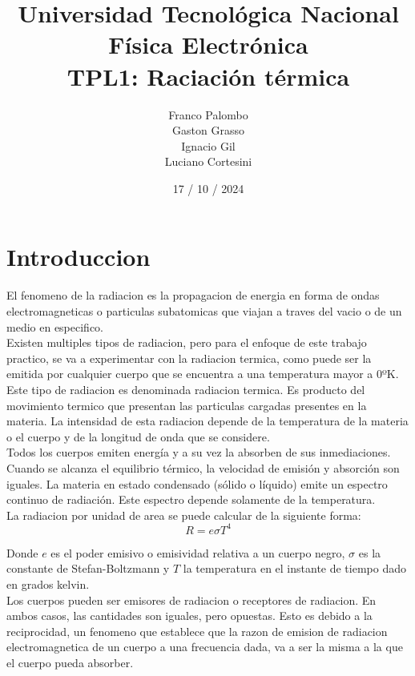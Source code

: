 \documentclass[a4paper,12pt]{report}
\title{%
  \fontsize{25}{0}\selectfont Universidad Tecnológica Nacional \\
  \fontsize{22}{30}\selectfont Física Electrónica \\
  \fontsize{18}{25}\selectfont TPL1: Raciación térmica
}
\author{
Franco Palombo\\
Gaston Grasso\\
Ignacio Gil\\
Luciano Cortesini\\
}
\date{17 / 10 / 2024}
\begin{document}
\maketitle

\chapter{Introduccion}
  El fenomeno de la radiacion es la propagacion de energia en forma de ondas electromagneticas o particulas subatomicas
  que viajan a traves del vacio o de un medio en especifico.\\

  Existen multiples tipos de radiacion, pero para el enfoque de este trabajo practico, se va a experimentar con la
  radiacion termica, como puede ser la emitida por cualquier cuerpo que se encuentra a una temperatura mayor a 0ºK.
  Este tipo de radiacion es denominada radiacion termica. Es producto del movimiento termico que presentan las
  particulas cargadas presentes en la materia. La intensidad de esta radiacion depende de la temperatura de la materia
  o el cuerpo y de la longitud de onda que se considere.\\

  Todos los cuerpos emiten energía y a su vez la absorben de sus inmediaciones. Cuando se alcanza el equilibrio térmico,
  la velocidad de emisión y absorción son iguales. La materia en estado condensado (sólido o líquido) emite un espectro
  continuo de radiación. Este espectro depende solamente de la temperatura.\\

  La radiacion por unidad de area se puede calcular de la siguiente forma:
  \begin{equation}
    R = e \sigma T^4
  \end{equation}

  Donde $e$ es el poder emisivo o emisividad relativa a un cuerpo negro, $\sigma$ es la constante de Stefan-Boltzmann y
  $T$ la temperatura en el instante de tiempo dado en grados kelvin.\\

  Los cuerpos pueden ser emisores de radiacion o receptores de radiacion. En ambos casos, las cantidades son iguales,
  pero opuestas. Esto es debido a la reciprocidad, un fenomeno que establece que la razon de emision de radiacion
  electromagnetica de un cuerpo a una frecuencia dada, va a ser la misma a la que el cuerpo pueda absorber.\\
\end{document}
